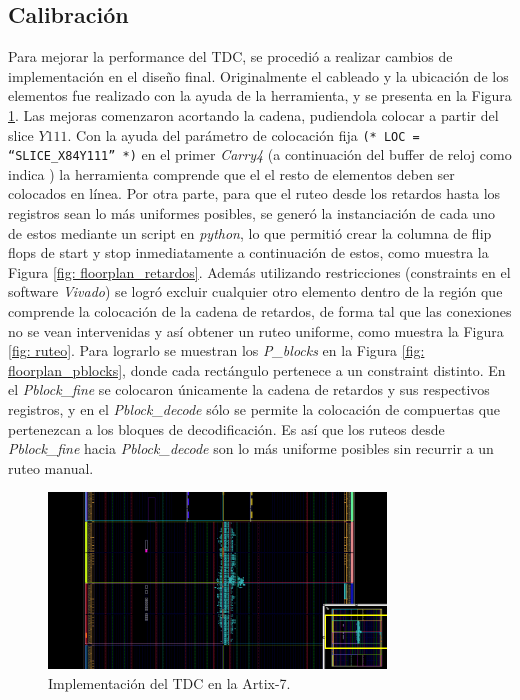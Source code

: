  \subsection{Calibración}
 Para mejorar la performance del TDC, se procedió a realizar cambios de implementación en el diseño final. Originalmente 
 el cableado y la ubicación de los elementos fue realizado con la ayuda de la herramienta, y se presenta en la Figura \ref{fig: floorplan_0}. 
 Las mejoras comenzaron acortando la cadena, pudiendola colocar a partir del slice $Y111$. Con la ayuda del
 parámetro de colocación fija \texttt{(* LOC = ``SLICE\_X84Y111'' *)} en el primer \textit{Carry4} (a continuación del buffer 
 de reloj como indica \cite{machado_novel_2018}) la herramienta comprende que el el resto de elementos deben ser colocados en línea. 
 Por otra parte, para que el ruteo desde 
 los retardos hasta los registros sean lo más uniformes posibles, se generó la instanciación de cada uno de estos mediante un script en
 \textit{python}, lo que permitió crear la columna de flip flops de start y stop inmediatamente a continuación de estos, como muestra la Figura \ref{fig: floorplan_retardos}.
 Además utilizando restricciones (constraints en el software \textit{Vivado}) se logró excluir cualquier otro elemento dentro de la región que comprende
 la colocación de la cadena de retardos,
 de forma tal que las conexiones no se vean intervenidas y así obtener un ruteo uniforme, como muestra la Figura \ref{fig: ruteo}. 
 Para lograrlo se muestran los \textit{P\_blocks} en la Figura \ref{fig: floorplan_pblocks}, donde cada
 rectángulo pertenece a un constraint distinto. En el \textit{Pblock\_fine} se colocaron
 únicamente la cadena de retardos y sus respectivos registros, y en el \textit{Pblock\_decode} sólo se permite la colocación de compuertas que 
 pertenezcan a los bloques de decodificación. Es así que los ruteos desde \textit{Pblock\_fine} hacia \textit{Pblock\_decode} son lo más
 uniforme posibles sin recurrir a un ruteo manual.

 \begin{figure}[H]
      \centering
      \includegraphics[width=0.8\textwidth]{imagenes/floorplan_0.png}
      \caption{Implementación del TDC en la Artix-7.}
      \label{fig: floorplan_0}
 \end{figure}

